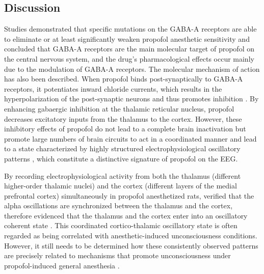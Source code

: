 \documentclass[twoside]{article}
\begin{document}
\hypertarget{FIGURE5}{}
\begin{multicols}{2}


\vspace*{5mm}

\section{Discussion}


Studies demonstrated that specific mutations on the GABA-A receptors are able to eliminate or at least significantly weaken propofol anesthetic sensitivity \citep{belelli1997interaction,mihic1997sites} and concluded that GABA-A receptors are the main molecular target of propofol on the central nervous system, and the drug's pharmacological effects occur mainly due to the modulation of GABA-A receptors. The molecular mechanism of action has also been described. 
When propofol binds post-synaptically to GABA-A receptors, it potentiates inward chloride currents, which results in the hyperpolarization of the post-synaptic neurons and thus promotes inhibition \citep{bai1999general,hemmings2005emerging}. By enhancing gabaergic inhibition at the thalamic reticular nucleus, propofol decreases excitatory inputs from the thalamus to the cortex. However, these inhibitory effects of propofol do not lead to a complete brain inactivation but promote large numbers of brain circuits to act in a coordinated manner and lead to a state characterized by highly structured electrophysiological oscillatory patterns \citep{ching2014modeling}, which constitute a distinctive signature of propofol on the EEG.



By recording electrophysiological activity from both the thalamus (different higher-order thalamic nuclei) and the cortex (different layers of the medial prefrontal cortex) simultaneously in propofol anesthetized rats, \citep{flores2017thalamocortical} verified that the alpha oscillations are synchronized between the thalamus and the cortex, therefore evidenced that the thalamus and the cortex enter into an oscillatory coherent state \citep{flores2017thalamocortical}. This coordinated cortico-thalamic oscillatory state is often regarded as being correlated with anesthetic-induced unconsciousness conditions. However, it still needs to be determined how these consistently observed patterns are precisely related to mechanisms that promote unconsciousness under propofol-induced general anesthesia \citep{lewis2012rapid}.


\end{multicols}
\end{document}
